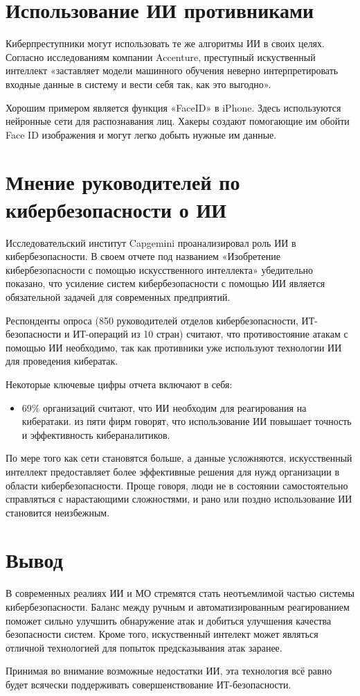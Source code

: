 \documentclass{article}
\begin{document}
	\section*{Использование ИИ противниками}
	
	Киберпреступники могут использовать те же алгоритмы ИИ в своих целях. Согласно исследованиям компании Accenture, преступный искуственный интеллект «заставляет модели машинного обучения неверно интерпретировать входные данные в систему и вести себя так, как это выгодно».
 \par
	Хорошим примером является функция «FaceID» в iPhone. Здесь используются нейронные сети для распознавания лиц. Хакеры создают помогающие им обойти Face ID изображения и могут легко добыть нужные им данные.
	
	\section*{Мнение руководителей по кибербезопасности о ИИ}
	
	Исследовательский институт Capgemini проанализировал роль ИИ в кибербезопасности. В своем отчете под названием «Изобретение кибербезопасности с помощью искусственного интеллекта» убедительно показано, что усиление систем кибербезопасности с помощью ИИ является обязательной задачей для современных предприятий.
 
	Респонденты опроса (850 руководителей отделов кибербезопасности, ИТ-безопасности и ИТ-операций из 10 стран) считают, что противостояние атакам с помощью ИИ необходимо, так как противники уже используют технологии ИИ для проведения кибератак.
	
	Некоторые ключевые цифры отчета включают в себя:
 \begin{itemize} 
	 из четырех опрошенных руководителей говорят, что искусственный интеллект позволяет их организации быстрее реагировать на нарушения.
	\item69\% организаций считают, что ИИ необходим для реагирования на кибератаки.
	 из пяти фирм говорят, что использование ИИ повышает точность и эффективность кибераналитиков.
 \end{itemize}
	По мере того как сети становятся больше, а данные усложняются, искусственный интеллект предоставляет более эффективные решения для нужд организации в области кибербезопасности. Проще говоря, люди не в состоянии самостоятельно справляться с нарастающими сложностями, и рано или поздно использование ИИ становится неизбежным.
	
	\section*{Вывод}
	В современных реалиях ИИ и МО стремятся стать неотъемлимой частью системы кибербезопасности. Баланс между ручным и автоматизированным реагированием поможет сильно улучшить обнаружение атак и добиться улучшения качества безопасности систем. Кроме того, искуственный интелект может являться отличной технологией для попыток предсказывания атак заранее.
 \par
	Принимая во внимание возможные недостатки ИИ, эта технология всё равно будет всячески поддерживать совершенствование ИТ-безопасности.
	
\end{document}
